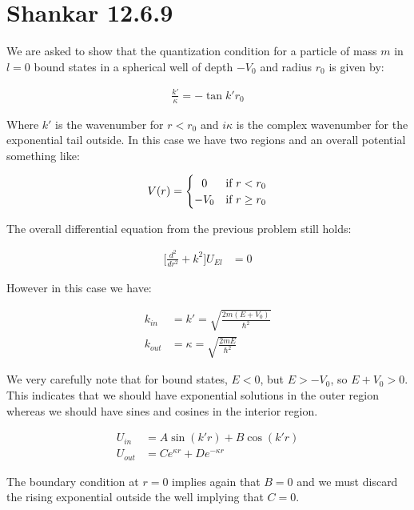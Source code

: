 \documentclass[paper=a4, fontsize=11pt]{scrartcl} %
\numberwithin{equation}{section} %
\numberwithin{figure}{section} %
\numberwithin{table}{section} %
\begin{document}
\section{Shankar 12.6.9}

We are asked to show that the quantization condition for a particle of mass $m$ in $l=0$ bound states in a spherical well of depth $-V_0$ and radius $r_0$ is given by:

\begin{align}
\frac{k'}{\kappa} = - \tan{k' r_0}
\end{align}

Where $k'$ is the wavenumber for $r<r_0$ and $i \kappa$ is the complex wavenumber for the exponential tail outside. In this case we have two regions and an overall potential something like:  


\[
  V(r) = \left\{\def\arraystretch{1.2}%
  \begin{array}{@{}c@{\quad}l@{}}
    0 & \text{if $r<r_0$}\\
    -V_0 & \text{if $r \geq r_0$}\\
  \end{array}\right.
\]

The overall differential equation from the previous problem still holds:

\begin{align}
\bigg[\frac{d^2}{dr^2} + k^2\bigg]U_{El} &= 0
\end{align}

However in this case we have:

\begin{align}
k_{in} &= k' = \sqrt{\frac{2m(E + V_0)}{\hbar^2}} \\
k_{out} &= \kappa = \sqrt{\frac{2mE}{\hbar^2}}
\end{align}

We very carefully note that for bound states, $E<0$, but $E> - V_0$, so $E + V_0 >0$. This indicates that we should have exponential solutions in the outer region whereas we should have sines and cosines in the interior region.

\begin{align}
U_{in} &= A \sin(k'r) + B \cos(k'r) \\ 
U_{out} &= Ce^{\kappa r} + De^{-\kappa r}
\end{align}

The boundary condition at $r = 0$ implies again that $B = 0$ and we must discard the rising exponential outside the well implying that $C=0$. 
\end{document}
